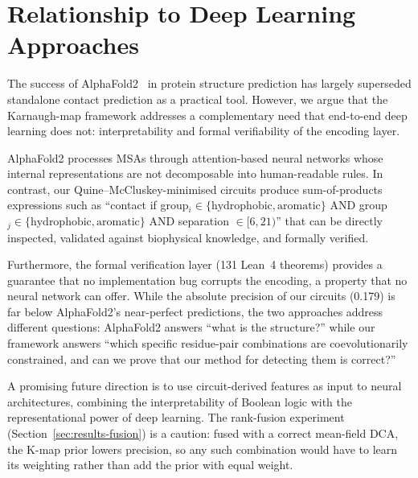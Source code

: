 \section{Relationship to Deep Learning Approaches}
\label{sec:methods-dl}

The success of AlphaFold2~\cite{jumper2021} in protein structure prediction
has largely superseded standalone contact prediction as a practical tool.
However, we argue that the Karnaugh-map framework addresses a complementary
need that end-to-end deep learning does not: interpretability and formal
verifiability of the encoding layer.

AlphaFold2 processes MSAs through attention-based neural networks whose
internal representations are not decomposable into human-readable rules.  In
contrast, our Quine--McCluskey-minimised circuits produce sum-of-products
expressions such as ``contact if group$_i \in \{\text{hydrophobic},
	\text{aromatic}\}$ AND group$_j \in \{\text{hydrophobic}, \text{aromatic}\}$
AND separation $\in [6, 21)$'' that can be directly inspected, validated
against biophysical knowledge, and formally verified.

Furthermore, the formal verification layer (131 Lean~4 theorems) provides a
guarantee that no implementation bug corrupts the encoding, a property that no
neural network can offer.  While the absolute precision of our circuits
(0.179) is far below AlphaFold2's near-perfect predictions, the two approaches
address different questions: AlphaFold2 answers ``what is the structure?''
while our framework answers ``which specific residue-pair combinations are
coevolutionarily constrained, and can we prove that our method for detecting
them is correct?''

A promising future direction is to use circuit-derived features as input to
neural architectures, combining the interpretability of Boolean logic with
the representational power of deep learning.  The rank-fusion experiment
(Section~\ref{sec:results-fusion}) is a caution: fused with a correct
mean-field DCA, the K-map prior lowers precision, so any such combination
would have to learn its weighting rather than add the prior with equal
weight.
